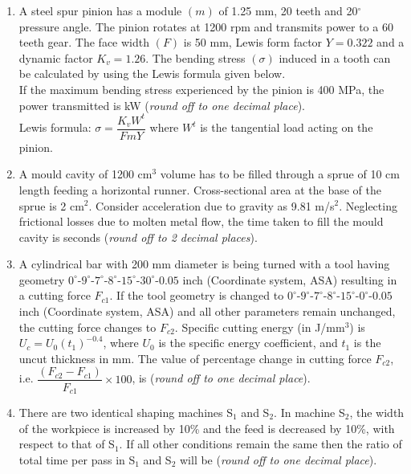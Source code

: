 \documentclass[12pt,onecolumn]{article}
\begin{document}
\begin{enumerate}
    \item A steel spur pinion has a module $(m)$ of 1.25 mm, 20 teeth and 20$^\circ$ pressure angle. The pinion rotates at 1200 rpm and transmits power to a 60 teeth gear. The face width $(F)$ is 50 mm, Lewis form factor $Y = 0.322$ and a dynamic factor $K_v = 1.26$. The bending stress $(\sigma)$ induced in a tooth can be calculated by using the Lewis formula given below.\\
          If the maximum bending stress experienced by the pinion is 400 MPa, the power transmitted is \underline{\hspace{2cm}} kW (\textit{round off to one decimal place}).\\
          Lewis formula: $\sigma = \dfrac{K_v W^t}{F m Y}$ where $W^t$ is the tangential load acting on the pinion.

    \item A mould cavity of 1200 cm$^3$ volume has to be filled through a sprue of 10 cm length feeding a horizontal runner. Cross-sectional area at the base of the sprue is 2 cm$^2$. Consider acceleration due to gravity as 9.81 m/s$^2$. Neglecting frictional losses due to molten metal flow, the time taken to fill the mould cavity is \underline{\hspace{2cm}} seconds (\textit{round off to 2 decimal places}).

    \item A cylindrical bar with 200 mm diameter is being turned with a tool having geometry $0^\circ$-$9^\circ$-$7^\circ$-$8^\circ$-$15^\circ$-$30^\circ$-$0.05$ inch (Coordinate system, ASA) resulting in a cutting force $F_{c1}$. If the tool geometry is changed to $0^\circ$-$9^\circ$-$7^\circ$-$8^\circ$-$15^\circ$-$0^\circ$-$0.05$ inch (Coordinate system, ASA) and all other parameters remain unchanged, the cutting force changes to $F_{c2}$. Specific cutting energy (in J/mm$^3$) is $U_c = U_0 (t_1)^{-0.4}$, where $U_0$ is the specific energy coefficient, and $t_1$ is the uncut thickness in mm. The value of percentage change in cutting force $F_{c2}$, i.e. $\dfrac{(F_{c2}-F_{c1})}{F_{c1}} \times 100$, is \underline{\hspace{2cm}} (\textit{round off to one decimal place}).

    \item There are two identical shaping machines S$_1$ and S$_2$. In machine S$_2$, the width of the workpiece is increased by 10\% and the feed is decreased by 10\%, with respect to that of S$_1$. If all other conditions remain the same then the ratio of total time per pass in S$_1$ and S$_2$ will be \underline{\hspace{2cm}} (\textit{round off to one decimal place}).


\end{enumerate}
\end{document}

